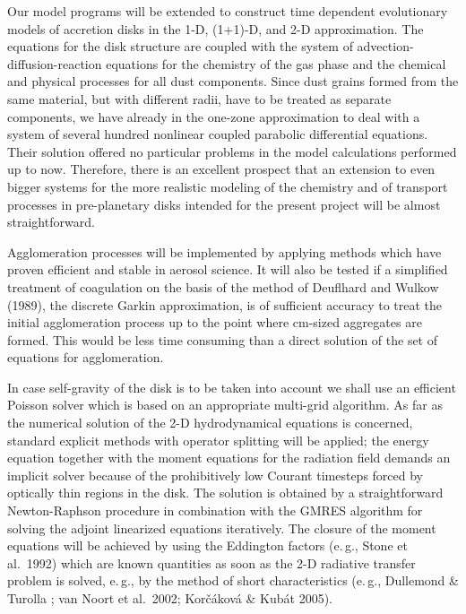 Our model programs will be extended to construct time dependent
evolutionary models of accretion disks in the 1-D, (1+1)-D, and
2-D approximation. The equations for the disk structure are
coupled with the system of advection-diffusion-reaction equations
for the chemistry of the gas phase and the chemical and physical
processes for all dust components.  Since dust grains formed from
the same material, but with different radii, have to be treated as
separate components, we have already in the one-zone approximation
to deal with a system of several hundred nonlinear coupled
parabolic differential equations. Their solution offered no
particular problems in the model calculations performed up to now.
Therefore, there is an excellent prospect that an extension to
even bigger systems for the more realistic modeling of the
chemistry and of transport processes in pre-planetary disks
intended for the present project will be almost straightforward.

Agglomeration processes will be implemented by applying methods
which have proven efficient and stable in aerosol science. It will
also be tested if a simplified treatment of coagulation on the
basis of the method of Deuflhard and Wulkow (1989), the discrete
Garkin approximation, is of sufficient accuracy to treat the
initial agglomeration process up to the point where cm-sized
aggregates are formed. This would be less time consuming than a
direct solution of the set of equations for agglomeration.

In case self-gravity of the disk is to be taken into account
we shall use an efficient Poisson solver which is based on an
appropriate multi-grid algorithm. As far as the numerical solution
of the 2-D hydrodynamical equations is concerned, standard
explicit methods with operator splitting will be applied; the
energy equation together with the moment equations for the
radiation field demands an implicit solver because of the
prohibitively low Courant timesteps forced by optically thin
regions in the disk. The solution is obtained by a straightforward
Newton-Raphson procedure in combination with the GMRES algorithm
for solving the adjoint linearized equations iteratively. The
closure of the moment equations will be achieved by using the
Eddington factors (e.\,g., Stone et al.~1992) which are known
quantities as soon as the 2-D radiative transfer problem is
solved, e.\,g., by the method of short characteristics (e.\,g.,
Dullemond \& Turolla ;
van Noort et al.~2002; Kor{\v c}{\'a}kov{\'a} \& {Kub{\'a}t}
2005).

